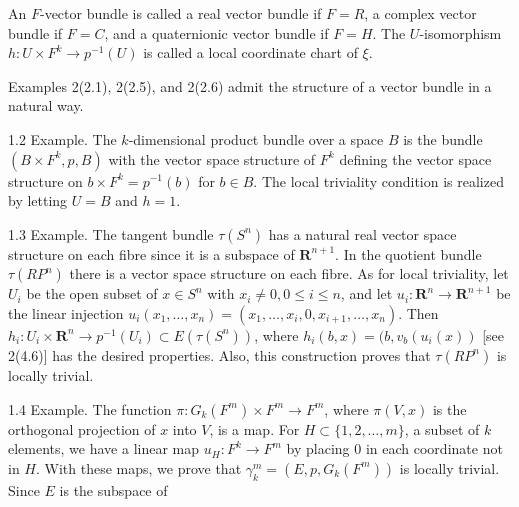 An $F$-vector bundle is called a real vector bundle if $F = R$, a complex vector bundle if $F = C$, and a quaternionic vector bundle if $F = H$. The $U$-isomorphism $h: U \times F^k \rightarrow p^{-1}(U)$ is called a local coordinate chart of $\xi$.

Examples 2(2.1), 2(2.5), and 2(2.6) admit the structure of a vector bundle in a natural way.

1.2 Example. The $k$-dimensional product bundle over a space $B$ is the bundle $(B \times F^k, p, B)$ with the vector space structure of $F^k$ defining the vector space structure on $b \times F^k = p^{-1}(b)$ for $b \in B$. The local triviality condition is realized by letting $U = B$ and $h = 1$.

1.3 Example. The tangent bundle $\tau(S^n)$ has a natural real vector space structure on each fibre since it is a subspace of $\mathbf{R}^{n+1}$. In the quotient bundle $\tau(RP^n)$ there is a vector space structure on each fibre. As for local triviality, let $U_i$ be the open subset of $x \in S^n$ with $x_i \neq 0, 0 \leq i \leq n$, and let $u_i: \mathbf{R}^n \rightarrow \mathbf{R}^{n+1}$ be the linear injection $u_i(x_1, \ldots, x_n) = (x_1, \ldots, x_i, 0, x_{i+1}, \ldots, x_n)$. Then $h_i: U_i \times \mathbf{R}^n \rightarrow p^{-1}(U_i) \subset E(\tau(S^n))$, where $h_i(b, x) = (b, v_b(u_i(x))$ [see 2(4.6)] has the desired properties. Also, this construction proves that $\tau(RP^n)$ is locally trivial.

1.4 Example. The function $\pi: G_k(F^m) \times F^m \rightarrow F^m$, where $\pi(V, x)$ is the orthogonal projection of $x$ into $V$, is a map. For $H \subset \{1, 2, \ldots, m\}$, a subset of $k$ elements, we have a linear map $u_H: F^k \rightarrow F^m$ by placing 0 in each coordinate not in $H$. With these maps, we prove that $\gamma_k^m = (E, p, G_k(F^m))$ is locally trivial. Since $E$ is the subspace of
